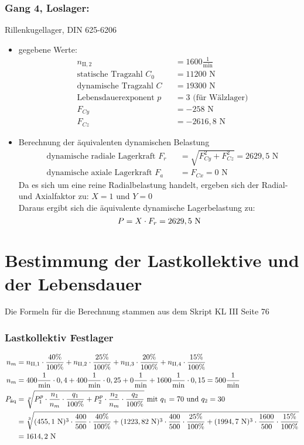\subsubsection{Gang 4, Loslager:} Rillenkugellager, DIN 625-6206\\
\begin{itemize}
	\item gegebene Werte:
	\begin{align*}
	&n_{{\mathord{\mathrm{II}},2}} &&=  1600 \frac{1}{\text{min}} \\
	&\text{statische Tragzahl } C_{0} &&= 11200 \text{ N}\\
	&\text{dynamische Tragzahl } C &&= 19300\text{ N} \\
	&\text{Lebensdauerexponent } p &&= 3 \text{ (für Wälzlager)} \\
	&F_{Cy} && = -258 \text{ N}\\
	&F_{Cz} && = -2616,8 \text{ N}
	\end{align*} 
	\item Berechnung der äquivalenten dynamischen Belastung
	\begin{align*}
	&\text{dynamische radiale Lagerkraft } F_r&& = \sqrt{F_{Cy}^2 + F_{Cz}^2 } =2629,5 \text{ N} \\
	&\text{dynamische axiale Lagerkraft } F_a&& = F_{Cx} = 0\text{ N}
	\end{align*} 
	Da es sich um eine reine Radialbelastung handelt, ergeben sich der Radial- und Axialfaktor zu: $X= 1$ und $Y=0$\\
	Daraus ergibt sich die äquivalente dynamische Lagerbelastung zu:  
	\[
	P= X \cdot F_r =2629,5\text{ N}
	\]
\end{itemize}
\newpage

\section{Bestimmung der Lastkollektive und der Lebensdauer}
Die Formeln für die Berechnung stammen aus dem Skript KL III Seite 76
\subsubsection{Lastkollektiv Festlager}
\begin{align*}
	n_m &= n_{\mathord{\mathrm{II}},1} \cdot \frac{40 \%}{100 \%} + n_{\mathord{\mathrm{II}},2} \cdot \frac{25 \%}{100 \%} + n_{\mathord{\mathrm{II}},3} \cdot \frac{20 \%}{100 \%} + n_{\mathord{\mathrm{II}},4} \cdot \frac{15 \%}{100 \%} \\
	n_m &= 400 \frac{1}{\text{min}} \cdot 0,4 + 400 \frac{1}{\text{min}} \cdot 0,25 + 0 \frac{1}{\text{min}} + 1600 \frac{1}{\text{min}} \cdot 0,15 = 500 \frac{1}{\text{min}} \\
	P_{\text{äq}} &= \sqrt[p]{P_1 ^{p} \cdot \frac{n_1}{n_m} \cdot \frac{q_1}{100\% } + P_2 ^{p} \cdot \frac{n_2}{n_m} \cdot \frac{q_2}{100 \%}} \text{ mit $q_1 = 70$ und $q_2= 30$} \\
	&= \sqrt[3]{(455,1 \text{ N}) ^{3} \cdot \frac{400}{500} \cdot \frac{40 \%}{100 \%} +(1223,82 \text{ N} )^{3} \cdot \frac{400}{500} \cdot \frac{25 \%}{100\% } +(1994,7 \text{ N} )^{3} \cdot \frac{1600}{500} \cdot \frac{15 \%}{100\% }} \\
	&= 1614,2 \text{ N}
\end{align*}
